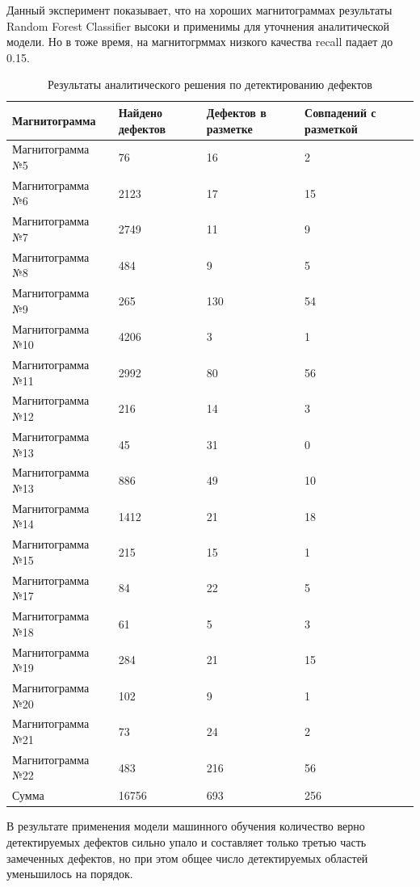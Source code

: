 \documentclass[a4paper,article,14pt]{extarticle}
\begin{document}
Данный эксперимент показывает, что на хороших магнитограммах результаты Random Forest Classifier 
высоки и применимы для уточнения аналитической модели. Но в тоже время, на магнитогрммах низкого 
качества recall падает до 0.15.

\begin{center}
    \begin{longtable}{|p{5cm}|p{3cm}|p{3cm}|p{3cm}|}
        \caption{Результаты аналитического решения по детектированию дефектов}\\\hline
        Магнитограмма & Найдено дефектов & Дефектов в разметке & Совпадений с разметкой \\ \hline
        Магнитограмма №5	& 76	& 16	& 2 \\ \hline
        Магнитограмма №6	& 2123	& 17	& 15 \\ \hline
        Магнитограмма №7	& 2749	& 11  	& 9 \\ \hline
        Магнитограмма №8	& 484	& 9	    & 5 \\ \hline
        Магнитограмма №9	& 265	& 130	& 54 \\ \hline
        Магнитограмма №10	& 4206	& 3	    & 1 \\ \hline
        Магнитограмма №11	& 2992	& 80	& 56 \\ \hline
        Магнитограмма №12	& 216	& 14	& 3 \\ \hline
        Магнитограмма №13	& 45	& 31	& 0 \\ \hline
        Магнитограмма №13	& 886	& 49	& 10 \\ \hline
        Магнитограмма №14	& 1412	& 21	& 18 \\ \hline
        Магнитограмма №15	& 215	& 15	& 1 \\ \hline
        Магнитограмма №17	& 84	& 22	& 5 \\ \hline
        Магнитограмма №18	& 61	& 5	    & 3 \\ \hline
        Магнитограмма №19	& 284	& 21	& 15 \\ \hline
        Магнитограмма №20	& 102	& 9	    & 1 \\ \hline
        Магнитограмма №21	& 73	& 24	& 2 \\ \hline
        Магнитограмма №22	& 483	& 216	& 56 \\ \hline
        Сумма	& 16756	& 693	& 256 \\ \hline
    \end{longtable}
\end{center}

В результате применения модели машинного обучения количество верно детектируемых дефектов сильно 
упало и составляет только третью часть замеченных дефектов, но при этом общее число детектируемых 
областей уменьшилось на порядок.
\end{document}
